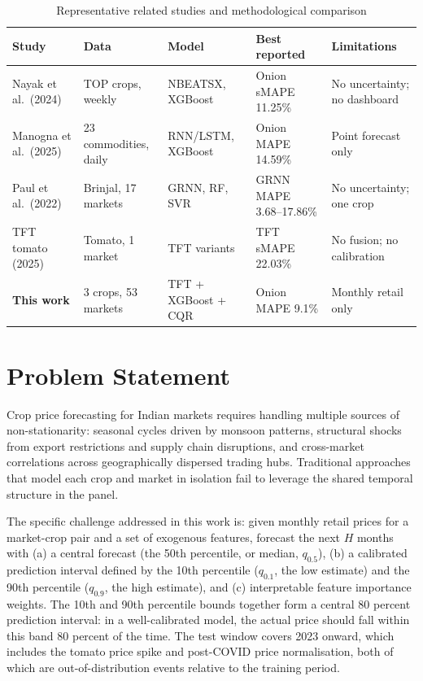 \documentclass[12pt,a4paper]{report}
\begin{document}
\begin{table}[H]
\centering
\caption{Representative related studies and methodological comparison}
\label{tab:ch2_related}
\footnotesize
\setlength{\tabcolsep}{3pt}
\renewcommand{\arraystretch}{1.1}
\begin{tabular}{@{}p{}p{}p{}p{}p{}@{}}
\toprule
\textbf{Study} & \textbf{Data} & \textbf{Model} & \textbf{Best reported} & \textbf{Limitations} \\
\midrule
Nayak et al.\ (2024)   & TOP crops, weekly  & NBEATSX, XGBoost      & Onion sMAPE 11.25\%      & No uncertainty; no dashboard \\
Manogna et al.\ (2025) & 23 commodities, daily & RNN/LSTM, XGBoost  & Onion MAPE 14.59\%       & Point forecast only \\
Paul et al.\ (2022)    & Brinjal, 17 markets & GRNN, RF, SVR        & GRNN MAPE 3.68--17.86\% & No uncertainty; one crop \\
TFT tomato (2025)      & Tomato, 1 market   & TFT variants          & TFT sMAPE 22.03\%        & No fusion; no calibration \\
\textbf{This work}     & 3 crops, 53 markets & TFT + XGBoost + CQR  & Onion MAPE 9.1\%         & Monthly retail only \\
\bottomrule
\end{tabular}
\renewcommand{\arraystretch}{1.0}
\end{table}

\chapter{Problem Statement}

Crop price forecasting for Indian markets requires handling multiple sources of
non-stationarity: seasonal cycles driven by monsoon patterns, structural shocks from export
restrictions and supply chain disruptions, and cross-market correlations across geographically
dispersed trading hubs. Traditional approaches that model each crop and market in
isolation fail to leverage the shared temporal structure in the panel.

The specific challenge addressed in this work is: given monthly retail prices for a
market-crop pair and a set of exogenous features, forecast the next $H$ months with
(a) a central forecast (the 50th percentile, or median, $q_{0.5}$), (b) a calibrated
prediction interval defined by the 10th percentile ($q_{0.1}$, the low estimate) and the
90th percentile ($q_{0.9}$, the high estimate), and (c) interpretable feature importance
weights. The 10th and 90th percentile bounds together form a central 80 percent prediction
interval: in a well-calibrated model, the actual price should fall within this band
80 percent of the time. The test window covers 2023 onward, which includes the tomato price
spike and post-COVID price normalisation, both of which are out-of-distribution events
relative to the training period.
\end{document}
